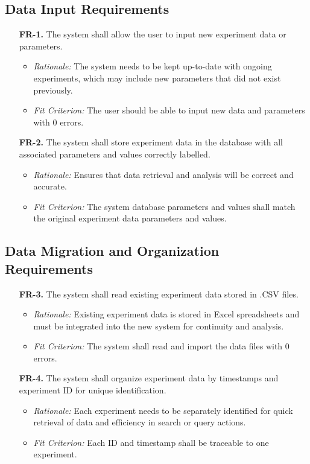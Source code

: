 \documentclass[12pt]{article}
\begin{document}
\subsection{Data Input Requirements}
  \begin{enumerate}
    \item[\textbf{FR-1.}] The system shall allow the user to input new experiment data or parameters.
    \begin{itemize}
    \item \textit{Rationale:} The system needs to be kept up-to-date with ongoing experiments, which may include new parameters that did not exist previously.
    \item \textit{Fit Criterion:} The user should be able to input new data and parameters with 0 errors.
    \end{itemize}
    \item[\textbf{FR-2.}] The system shall store experiment data in the database with all associated parameters and values correctly labelled.
    \begin{itemize}
      \item \textit{Rationale:} Ensures that data retrieval and analysis will be correct and accurate.
      \item \textit{Fit Criterion:} The system database parameters and values shall match the original experiment data parameters and values.
    \end{itemize}
  \end{enumerate}

\subsection{Data Migration and Organization Requirements}
  \begin{enumerate}
    \item[\textbf{FR-3.}] The system shall read existing experiment data stored in .CSV files.
    \begin{itemize}
      \item \textit{Rationale:} Existing experiment data is stored in Excel spreadsheets and must be integrated into the new system for continuity and analysis.
      \item \textit{Fit Criterion:} The system shall read and import the data files with 0 errors.
    \end{itemize}
    \item[\textbf{FR-4.}] The system shall organize experiment data by timestamps and experiment ID for unique identification.
    \begin{itemize}
      \item \textit{Rationale:} Each experiment needs to be separately identified for quick retrieval of data and efficiency in search or query actions.
      \item \textit{Fit Criterion:} Each ID and timestamp shall be traceable to one experiment.
    \end{itemize}
  \end{enumerate}
\end{document}
